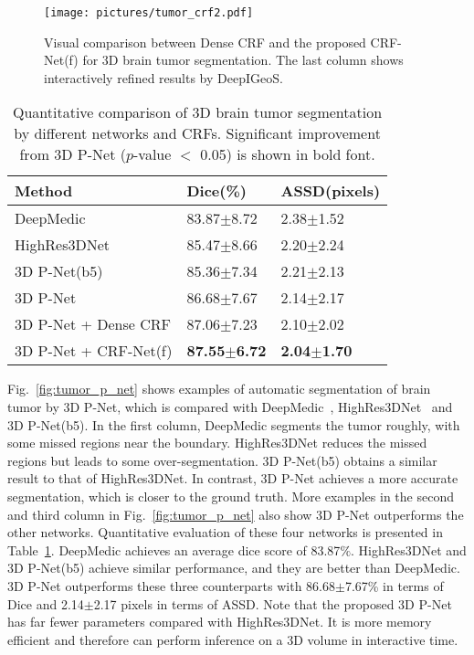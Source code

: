 \documentclass[10pt,journal,compsoc]{IEEEtran}
\begin{document}
\begin{figure}[t]
	\centering
	\texttt{[image: pictures/tumor\_crf2.pdf]}
	\caption[Visual comparison between Dense CRF and the proposed CRF-Net(f) for 3D brain tumor segmentation]{ 
		Visual comparison between Dense CRF and the proposed CRF-Net(f) for 3D brain tumor segmentation. 
		The last column shows interactively refined results by DeepIGeoS.
	} 
	\label{fig:tumor_p_net_crf}
\end{figure}


\begin{table}
	\centering\label{key}
	\small
	\caption{Quantitative comparison of 3D brain tumor segmentation by different networks and CRFs. 
		Significant improvement from 3D P-Net ($p$-value $<$ 0.05) is shown in bold font.}
	\label{lab:tumor_p_net}
	\begin{tabular}{lll}
		
		\hline
		Method    & Dice(\%) & ASSD(pixels) \\ \hline
		DeepMedic~\cite{Kamnitsas2017}       & 83.87$\pm$8.72 & 2.38$\pm$1.52 \\ 
		HighRes3DNet~\cite{Li2017}   & 85.47$\pm$8.66 & 2.20$\pm$2.24 \\
		3D P-Net(b5) & 85.36$\pm$7.34 & 2.21$\pm$2.13 \\
		3D P-Net     & 86.68$\pm$7.67 & 2.14$\pm$2.17 \\  
		3D P-Net + Dense CRF & 87.06$\pm$7.23 & 2.10$\pm$2.02 \\ 
		3D P-Net + CRF-Net(f) & \textbf{87.55$\pm$6.72} & \textbf{2.04$\pm$1.70} \\ \hline
	\end{tabular}
	
\end{table}
Fig.~\ref{fig:tumor_p_net} shows examples of automatic segmentation of brain tumor by 3D P-Net, which is compared with DeepMedic~\cite{Kamnitsas2017}, HighRes3DNet~\cite{Li2017} and 3D P-Net(b5). In the first column, DeepMedic segments the tumor roughly, with some missed regions near the boundary. HighRes3DNet reduces the missed regions but leads to some over-segmentation. 3D P-Net(b5) obtains a similar result to that of HighRes3DNet. In contrast, 3D P-Net achieves a more accurate segmentation, which is closer to the ground truth. More examples in the second and third column in Fig.~\ref{fig:tumor_p_net} also show 3D P-Net outperforms the other networks. Quantitative evaluation of these four networks is presented in Table~\ref{lab:tumor_p_net}.
DeepMedic achieves an average dice score of 83.87$\%$. HighRes3DNet and 3D P-Net(b5) achieve similar performance, and they are better than DeepMedic. 3D P-Net outperforms these three counterparts with
86.68$\pm$7.67\% in terms of Dice and 2.14$\pm$2.17 pixels in terms of ASSD. Note that the proposed 3D P-Net has far fewer parameters compared with HighRes3DNet. It is more memory efficient and therefore can perform inference on a 3D volume in interactive time.    
\end{document}
